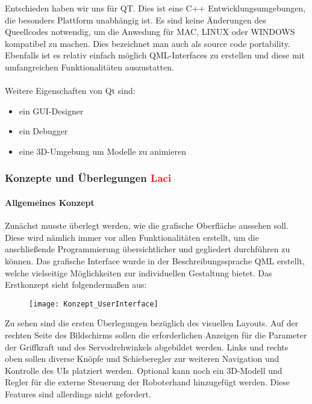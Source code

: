 \documentclass[titlepage,12pt,twoside]{article}
\begin{document}
Entschieden haben wir uns für QT. Dies ist eine C++ Entwicklungsumgebungen, die besonders Plattform unabhängig ist. Es sind keine Änderungen
des Queellcodes notwendig, um die Anwedung für MAC, LINUX oder WINDOWS kompatibel zu machen. Dies bezeichnet man auch als source 
code portability. Ebenfalls ist es relativ einfach möglich QML-Interfaces zu erstellen und diese mit umfangreichen Funktionalitäten auszustatten. \\
\\ 
Weitere Eigenschaften von Qt sind:
\begin{itemize}
	\item ein GUI-Designer
	\item ein Debugger
	\item eine 3D-Umgebung um Modelle zu animieren
\end{itemize}

\subsubsection{Konzepte und Überlegungen \textcolor{red}{Laci}}

\paragraph{Allgemeines Konzept}
\hfill \break
\hfill \break
Zunächst musste überlegt werden, wie die grafische Oberfläche aussehen soll. Diese wird nämlich immer vor allen Funktionalitäten 
erstellt, um die anschließende Programmierung übersichtlicher und gegliedert durchführen zu können. Das grafische Interface wurde 
in der Beschreibungssprache QML erstellt, welche vielseitige Möglichkeiten zur individuellen Gestaltung bietet. Das Erstkonzept
sieht folgendermaßen aus:
	\begin{figure}[H]
		\begin{center}
			\scalebox{1.2}
			{\texttt{[image: Konzept\_UserInterface]}}
		\end{center}
	\end{figure}
Zu sehen sind die ersten Überlegungen bezüglich des visuellen Layouts. Auf der rechten Seite des Bildschirms sollen die erforderlichen
Anzeigen für die Parameter der Griffkraft und des Servodrehwinkels abgebildet werden. Links und rechts oben sollen diverse Knöpfe 
und Schieberegler zur weiteren Navigation und Kontrolle des UIs platziert werden. Optional kann noch ein 3D-Modell und Regler für 
die externe Steuerung der Roboterhand hinzugefügt werden. Diese Features sind allerdings nicht gefordert. \\
\\
\end{document}
